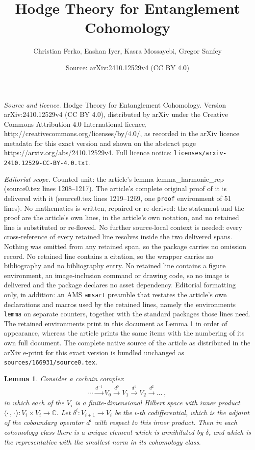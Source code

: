 \documentclass[10pt,a4paper]{amsart}
\title{Hodge Theory for Entanglement Cohomology}
\author{Christian Ferko, Eashan Iyer, Kasra Mossayebi, Gregor Sanfey}
\date{Source: arXiv:2410.12529v4 (CC BY 4.0)}
\newtheorem{lemma}{Lemma}
\begin{document}
\maketitle

\noindent\emph{Source and licence.} Hodge Theory for Entanglement Cohomology. Version arXiv:2410.12529v4 (CC BY 4.0), distributed by arXiv under the Creative Commons Attribution 4.0 International licence, http://creativecommons.org/licenses/by/4.0/, as recorded in the arXiv licence metadata for this exact version and shown on the abstract page https://arxiv.org/abs/2410.12529v4. Full licence notice: \texttt{licenses/arxiv-2410.12529-CC-BY-4.0.txt}.\par\smallskip

\noindent\textit{Editorial scope.} Counted unit: the article's lemma lemma\_harmonic\_rep (source0.tex lines 1208--1217). The article's complete original proof of it is delivered with it (source0.tex lines 1219--1269, one \texttt{proof} environment of 51 lines). No mathematics is written, repaired or re-derived: the statement and the proof are the article's own lines, in the article's own notation, and no retained line is substituted or re-flowed.  No further source-local context is needed: every cross-reference of every retained line resolves inside the two delivered spans.  Nothing was omitted from any retained span, so the package carries no omission record.  No retained line contains a citation, so the wrapper carries no bibliography and no bibliography entry.  No retained line contains a figure environment, an image-inclusion command or drawing code, so no image is delivered and the package declares no asset dependency.  Editorial formatting only, in addition: an AMS \texttt{amsart} preamble that restates the article's own declarations and macros used by the retained lines, namely the environments \texttt{lemma} on separate counters, together with the standard packages those lines need.  The retained environments print in this document as Lemma 1 in order of appearance, whereas the article prints the same items with the numbering of its own full document.  The complete native source of the article as distributed in the arXiv e-print for this exact version is bundled unchanged as \texttt{sources/166931/source0.tex}.
\begin{lemma}\label{lemma_harmonic_rep}
Consider a cochain complex
\begin{align}
    \cdots \xrightarrow{d^{-1}} V_0 \xrightarrow{d^{0}} V_1 \xrightarrow{d^{1}} V_2 \xrightarrow{d^{2}} \ldots \, ,
\end{align}
%
in which each of the $V_i$ is a finite-dimensional Hilbert space with inner product $\langle \cdot \, , \, \cdot \rangle : V_i \times V_i \to \mathbb{C}$. Let $\delta^i : V_{i + 1} \to V_{i}$ be the $i$-th codifferential, which is the adjoint of the coboundary operator $d^i$ with respect to this inner product. Then in each cohomology class there is a unique element which is annihilated by $\delta$, and which is the representative with the smallest norm in its cohomology class. 

\end{lemma}
\end{document}
